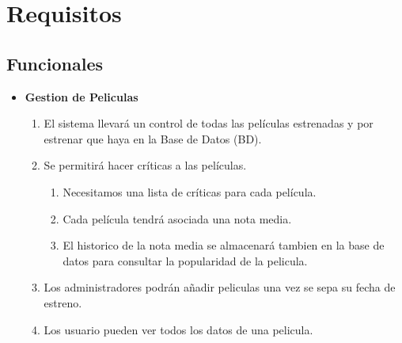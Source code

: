 \documentclass{article}
\begin{document}
\section{Requisitos}
    \subsection{Funcionales}
	\begin{itemize}
	
	\item \textbf{Gestion de Peliculas}
		\begin{enumerate}[label=\bfseries RF- \arabic*:]
		\item El sistema llevará un control de todas las películas estrenadas y por estrenar que haya en la Base de Datos (BD).
		\item Se permitirá hacer críticas a las películas.
			\begin{enumerate}[label=\bfseries 2.\arabic*:]
				\item Necesitamos una lista de críticas para cada película.
				\item Cada película tendrá asociada una nota media.
				\item El historico de la nota media se almacenará tambien en la base de datos para consultar la popularidad de la pelicula.
			\end{enumerate}
		\item Los administradores podrán añadir peliculas una vez se sepa su fecha de estreno.
		\item Los usuario pueden ver todos los datos de una pelicula.
		\end{enumerate}
		

\end{itemize}
\end{document}
